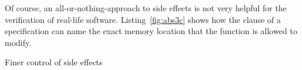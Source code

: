 \clearpage

Of course, an all-or-nothing-approach to side effects is not very helpful
for the verification of real-life software.
Listing~\ref{fig:abs3c} shows how the  clause of a
specification can name the exact memory location that the
function is allowed to modify.

\begin{listing}[hbt]
\begin{minipage}{\textwidth}

\end{minipage}
\caption{\label{fig:abs3c} Finer control of side effects}
\end{listing}


